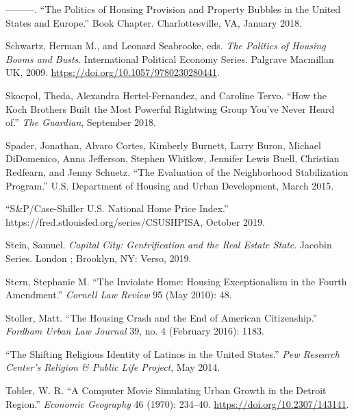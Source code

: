 \documentclass[12pt,oneside]{psthesis}
\begin{document}
\leavevmode\hypertarget{ref-schwartz2018politics}{}%
---------. ``The Politics of Housing Provision and Property Bubbles in the United States and Europe.'' Book Chapter. Charlottesville, VA, January 2018.

\leavevmode\hypertarget{ref-schwartz2009politics}{}%
Schwartz, Herman M., and Leonard Seabrooke, eds. \emph{The Politics of Housing Booms and Busts}. International Political Economy Series. Palgrave Macmillan UK, 2009. \url{https://doi.org/10.1057/9780230280441}.

\leavevmode\hypertarget{ref-skocpol2018how}{}%
Skocpol, Theda, Alexandra Hertel-Fernandez, and Caroline Tervo. ``How the Koch Brothers Built the Most Powerful Rightwing Group You've Never Heard of.'' \emph{The Guardian}, September 2018.

\leavevmode\hypertarget{ref-spader2015evaluation}{}%
Spader, Jonathan, Alvaro Cortes, Kimberly Burnett, Larry Buron, Michael DiDomenico, Anna Jefferson, Stephen Whitlow, Jennifer Lewis Buell, Christian Redfearn, and Jenny Schuetz. ``The Evaluation of the Neighborhood Stabilization Program.'' U.S. Department of Housing and Urban Development, March 2015.

\leavevmode\hypertarget{ref-2019caseshiller}{}%
``S\&P/Case-Shiller U.S. National Home Price Index.'' https://fred.stlouisfed.org/series/CSUSHPISA, October 2019.

\leavevmode\hypertarget{ref-stein2019capital}{}%
Stein, Samuel. \emph{Capital City: Gentrification and the Real Estate State}. Jacobin Series. London ; Brooklyn, NY: Verso, 2019.

\leavevmode\hypertarget{ref-stern2010inviolate}{}%
Stern, Stephanie M. ``The Inviolate Home: Housing Exceptionalism in the Fourth Amendment.'' \emph{Cornell Law Review} 95 (May 2010): 48.

\leavevmode\hypertarget{ref-stollerHousingCrashEnd2016}{}%
Stoller, Matt. ``The Housing Crash and the End of American Citizenship.'' \emph{Fordham Urban Law Journal} 39, no. 4 (February 2016): 1183.

\leavevmode\hypertarget{ref-2014shifting}{}%
``The Shifting Religious Identity of Latinos in the United States.'' \emph{Pew Research Center's Religion \& Public Life Project}, May 2014.

\leavevmode\hypertarget{ref-tobler1970computer}{}%
Tobler, W. R. ``A Computer Movie Simulating Urban Growth in the Detroit Region.'' \emph{Economic Geography} 46 (1970): 234--40. \url{https://doi.org/10.2307/143141}.
\end{document}
